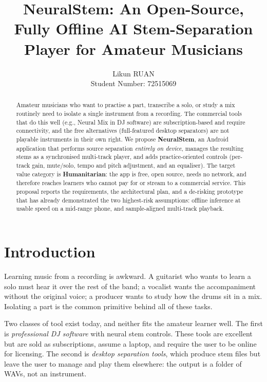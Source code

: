 \documentclass[letterpaper]{article} %
\title{NeuralStem: An Open-Source, Fully Offline AI Stem-Separation\\
Player for Amateur Musicians}
\author{
    Likun RUAN \\
    Student Number: 72515069
}
\begin{document}
\maketitle

\begin{abstract}
Amateur musicians who want to practise a part, transcribe a solo, or study a
mix routinely need to isolate a single instrument from a recording. The
commercial tools that do this well (e.g., Neural Mix in DJ software) are
subscription-based and require connectivity, and the free alternatives
(full-featured desktop separators) are not playable instruments in their own
right. We propose \textbf{NeuralStem}, an Android application that performs
source separation \emph{entirely on device}, manages the resulting stems as a
synchronised multi-track player, and adds practice-oriented controls (per-track
gain, mute/solo, tempo and pitch adjustment, and an equaliser). The target
value category is \textbf{Humanitarian}: the app is free, open source, needs no
network, and therefore reaches learners who cannot pay for or stream to a
commercial service. This proposal reports the requirements, the architectural
plan, and a de-risking prototype that has already demonstrated the two
highest-risk assumptions: offline inference at usable speed on a mid-range
phone, and sample-aligned multi-track playback.
\end{abstract}

\begin{links}
\end{links}

\section{Introduction}

Learning music from a recording is awkward. A guitarist who wants to learn a
solo must hear it over the rest of the band; a vocalist wants the
accompaniment without the original voice; a producer wants to study how the
drums sit in a mix. Isolating a part is the common primitive behind all of
these tasks.

Two classes of tool exist today, and neither fits the amateur learner well.
The first is \emph{professional DJ software} with neural stem controls. These
tools are excellent but are sold as subscriptions, assume a laptop, and require
the user to be online for licensing. The second is \emph{desktop separation
tools}, which produce stem files but leave the user to manage and play them
elsewhere: the output is a folder of WAVs, not an instrument.
\end{document}
